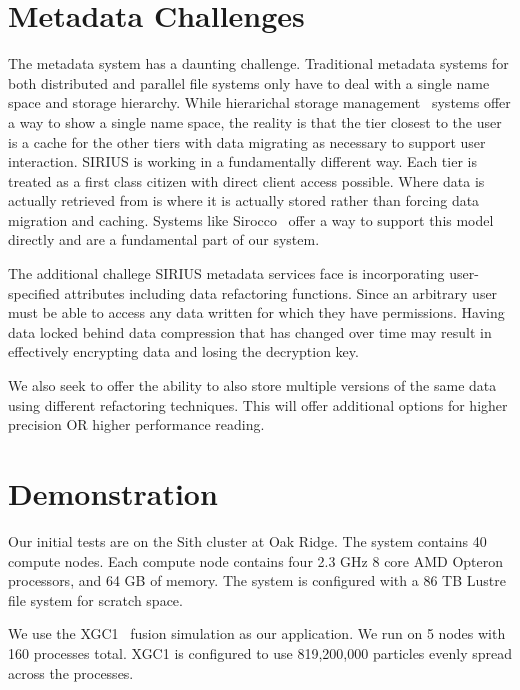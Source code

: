 \documentclass[letterpaper,twocolumn,10pt]{article}
\begin{document}
\section{Metadata Challenges}
\label{sec:metadata}

The metadata system has a daunting challenge. Traditional metadata systems for
both distributed and parallel file systems only have to deal with a single name
space and storage hierarchy. While hierarichal storage management~\cite{blaze:1992:hsm}
systems offer a way to show a single name space, the reality is that the tier
closest to the user is a cache for the other tiers with data migrating as
necessary to support user interaction. SIRIUS is working in a fundamentally
different way. Each tier is treated as a first class citizen with direct
client access possible. Where data is actually retrieved from is where it is
actually stored rather than forcing data migration and caching. Systems like
Sirocco~\cite{curry:2015:sirocco} offer a way to support this model directly and are a
fundamental part of our system.

The additional challege SIRIUS metadata services face is incorporating
user-specified attributes including data refactoring functions. Since an
arbitrary user must be able to access any data written for which they have
permissions. Having data locked behind data compression that has changed over
time may result in effectively encrypting data and losing the decryption key.

We also seek to offer the ability to also store multiple versions of the same
data using different refactoring techniques. This will offer additional options
for higher precision OR higher performance reading.

\section{Demonstration}
\label{sec:evaluation}

Our initial tests are on the Sith cluster at Oak Ridge. The system contains 40
compute nodes. Each compute node contains four 2.3 GHz 8 core AMD Opteron
processors, and 64 GB of memory. The system is configured with a 86 TB Lustre
file system for scratch space.

We use the XGC1~\cite{ku:2008:xgc1} fusion simulation as our application. We
run on 5 nodes with 160 processes total. XGC1 is configured to use 819,200,000
particles evenly spread across the processes.
\end{document}
